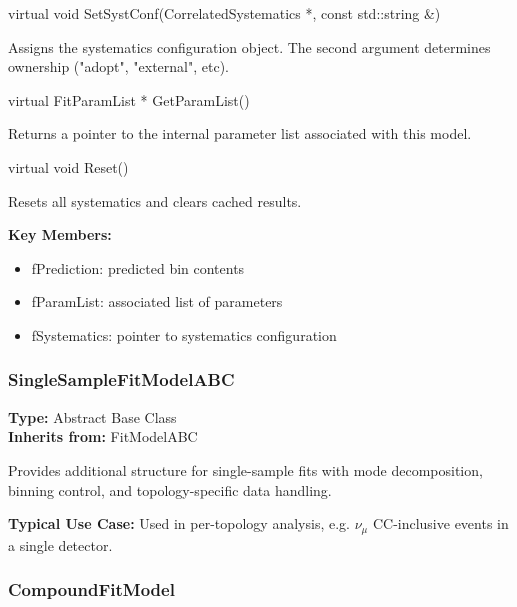 \begin{description}[align=left, labelsep=0.6em]
  \item[] {\color{cadmiumred} virtual void SetSystConf(CorrelatedSystematics *, const std::string \&)}

  Assigns the systematics configuration object. The second argument determines ownership ("adopt", "external", etc).

  \item[] {\color{cadmiumred} virtual FitParamList * GetParamList()}

  Returns a pointer to the internal parameter list associated with this model.

  \item[] {\color{cadmiumred} virtual void Reset()}

  Resets all systematics and clears cached results.

\end{description}

\vspace{0.5em}
\noindent\textbf{Key Members:}

\begin{itemize}
  \item {\color{amber}fPrediction}: predicted bin contents
  \item {\color{amber}fParamList}: associated list of parameters
  \item {\color{amber}fSystematics}: pointer to systematics configuration
\end{itemize}

\vspace{1em}
\subsubsection*{\color{cadmiumgreen}\bf SingleSampleFitModelABC}

\textbf{Type:} Abstract Base Class \\
\textbf{Inherits from:} {\color{cadmiumgreen} FitModelABC}

\vspace{0.5em}
Provides additional structure for single-sample fits with mode decomposition, binning control, and topology-specific data handling.

\vspace{0.5em}
\noindent\textbf{Typical Use Case:}
Used in per-topology analysis, e.g. $\nu_\mu$ CC-inclusive events in a single detector.

\vspace{1em}
\subsubsection*{\color{cadmiumgreen}\bf CompoundFitModel}

